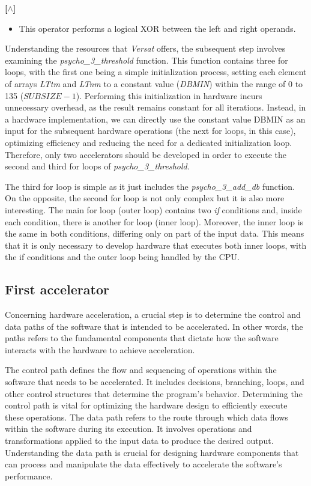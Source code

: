 \textbf{[$\wedge$]}
\begin{itemize}
\item This operator performs a logical XOR between the left and right operands.
\end{itemize}

\vspace{0.5cm}

Understanding the resources that \textit{Versat} offers, the subsequent step involves examining the \textit{psycho\_3\_threshold} function.
This function contains three for loops, with the first one being a simple initialization process, setting each element of arrays \textit{LTtm} and \textit{LTnm} to a constant value (\textit{DBMIN}) within the range of 0 to 135 ($SUBSIZE-1$). Performing this initialization in hardware incurs unnecessary overhead, as the result remains constant for all iterations. Instead, in a hardware implementation, we can directly use the constant value DBMIN as an input for the subsequent hardware operations (the next for loops, in this case), optimizing efficiency and reducing the need for a dedicated initialization loop.
Therefore, only two accelerators should be developed in order to execute the second and third for loops of \textit{psycho\_3\_threshold}.

The third for loop is simple as it just includes the \textit{psycho\_3\_add\_db} function. 
On the opposite, the second for loop is not only complex but it is also more interesting. The main for loop (outer loop) contains two \textit{if} conditions and, inside each condition, there is another for loop (inner loop). Moreover, the inner loop is the same in both conditions, differing only on part of the input data. This means that it is only necessary to develop hardware that executes both inner loops, with the if conditions and the outer loop being handled by the CPU.

\subsection{First accelerator}
Concerning hardware acceleration, a crucial step is to determine the control and data paths of the software that is intended to be accelerated. In other words, the paths refers to the fundamental components that dictate how the software interacts with the hardware to achieve acceleration.

The control path defines the flow and sequencing of operations within the software that needs to be accelerated. It includes decisions, branching, loops, and other control structures that determine the program's behavior. Determining the control path is vital for optimizing the hardware design to efficiently execute these operations.
The data path refers to the route through which data flows within the software during its execution. It involves operations and transformations applied to the input data to produce the desired output. Understanding the data path is crucial for designing hardware components that can process and manipulate the data effectively to accelerate the software's performance.

